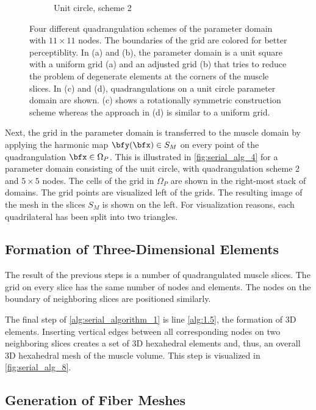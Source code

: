 \begin{figure}
\begin{subfigure}[t]{0.48\textwidth}
    \caption{Unit circle, scheme 2}%
    \label{fig:quad_3}%
  \end{subfigure}
  \caption{Four different quadrangulation schemes of the parameter domain with $11\times 11$ nodes. The boundaries of the grid are colored for better perceptiblity. In (a) and (b), the parameter domain is a unit square with a uniform grid (a) and an adjusted grid (b) that tries to reduce the problem of degenerate elements at the corners of the muscle slices. In (c) and (d), quadrangulations on a unit circle parameter domain are shown. (c) shows a rotationally symmetric construction scheme whereas the approach in (d) is similar to a uniform grid.}%
  \label{fig:quads}%
\end{figure}%

Next, the grid in the parameter domain is transferred to the muscle domain by applying the harmonic map $\bfy(\bfx) \in S_M$ on every point of the quadrangulation $\bfx \in \Omega_P$. This is illustrated in \cref{fig:serial_alg_4} for a parameter domain consisting of the unit circle, with quadrangulation scheme 2 and $5 \times 5$ nodes. The cells of the grid in $\Omega_P$ are shown in the right-most stack of domains. The grid points are visualized left of the grids. The resulting image of the mesh in the slices $S_M$ is shown on the left. For visualization reasons, each quadrilateral has been split into two triangles.

\subsection{Formation of Three-Dimensional Elements}

The result of the previous steps is a number of quadrangulated muscle slices. The grid on every slice has the same number of nodes and elements. The nodes on the boundary of neighboring slices are positioned similarly.

The final step of \cref{alg:serial_algorithm_1} is line \ref{alg:1.5}, the formation of 3D elements. Inserting vertical edges between all corresponding nodes on two neighboring slices creates a set of 3D hexahedral elements and, thus, an overall 3D hexahedral mesh of the muscle volume. This step is visualized in \cref{fig:serial_alg_8}.

\subsection{Generation of Fiber Meshes}\label{sec:generation_of_fiber_meshes}

